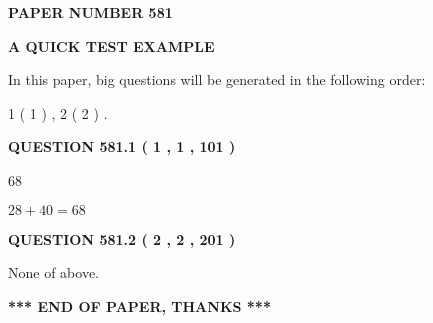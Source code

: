 \documentclass[12pt]{article}
\begin{document}
   
\newpage 
\setcounter{page}{ 
   581001 } 
   
   
   
   
 {\textbf{ \Large{ PAPER NUMBER  581  }}}
   
   
\vspace{0.2in}
   
   
   
   
   
   
 \vspace{0.2in}
{\LARGE {\textbf{ A QUICK TEST EXAMPLE}}}
   
   
   
\vspace{0.2in}
   
In this paper, big questions will be generated in the following order: 
   
   
   1 ( 1 )
 ,
   2 ( 2 )
 .
  
\vspace{0.2in}
  
{\textbf{\Large{QUESTION
581.1 
 ( 1 , 1 , 101 )
}}}
  
  
 
 
\noindent{}

68
 
 
 
 
\noindent{}

$ %
28 +  %
40=   %
68$
 
 
  
\vspace{0.2in}
  
{\textbf{\Large{QUESTION
581.2 
 ( 2 , 2 , 201 )
}}}
  
  
 
 
\noindent{}
 
 
 None of above.
 
 
 
 
   
   
 \vspace{0.2in}
 
   
   
   
   
\vspace{1.0in} 
{\textbf{\large{ *** END OF PAPER, THANKS *** }}} 
   
\end{document}
